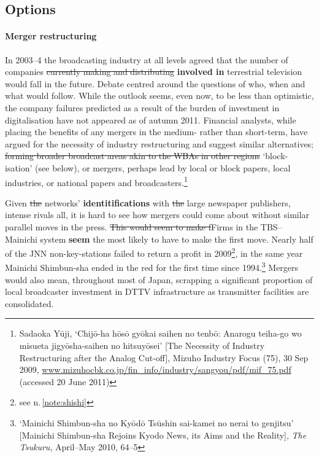 \documentclass[11pt, oneside, a4paper, headsepline]{scrartcl}
\begin{document}
\subsection{Options}

\paragraph*{Merger restructuring}
\label{subsec:merger}
In 2003--4 the broadcasting industry at all levels agreed that the number of companies \st{currently making and distributing} \textbf{involved in} terrestrial television would fall in the future. Debate centred around the questions of who, when and what would follow. While the outlook seems, even now, to be less than optimistic, the company failures predicted as a result of the burden of investment in digitalisation have not appeared as of autumn 2011.  
Financial analysts, while placing the benefits of any mergers in the medium- rather than short-term, have argued for the necessity of industry restructuring and suggest similar alternatives; \st{forming broader broadcast areas akin to the WBAs in other regions} `block-isation' (see below), or mergers, perhaps lead by local or block papers, local industries, or national papers and broadcasters.\footnote{Sadaoka Y\={u}ji, `Chij\={o}-ha h\={o}s\={o} gy\={o}kai saihen no tenb\={o}: Anarogu teiha-go wo misueta jigy\={o}sha-saihen no hitsuy\={o}sei' [The Necessity of Industry Restructuring after the Analog Cut-off],  Mizuho Industry Focus (75), 30 Sep 2009, \url{www.mizuhocbk.co.jp/fin_info/industry/sangyou/pdf/mif_75.pdf}  (accessed 20 June 2011)} 

Given \st{the} networks' \textbf{identitifications} with \st{the} large newspaper publishers, intense rivals all, it is hard to see how mergers could come about without similar parallel moves in the press. \st{This would seem to make f}Firms in the TBS--Mainichi system \textbf{seem} the most likely to have to make the first move. Nearly half of the JNN non-key-stations failed to return a profit in 2009\footnote{see n.\,\ref{note:shishi}}, in the same year Mainichi Shimbun-sha ended in the red for the first time since 1994.\footnote{`Mainichi Shimbun-sha no Kyōdō Tsūshin sai-kamei no nerai to genjitsu' [Mainichi Shimbun-sha Rejoins Kyodo News, its Aims and the Reality], \emph{The Tsukuru}, April--May 2010, 64--5} Mergers would also mean, throughout most of Japan, scrapping a significant proportion of local broadcaster investment in DTTV infrastructure as transmitter facilities are consolidated. %
\end{document}
